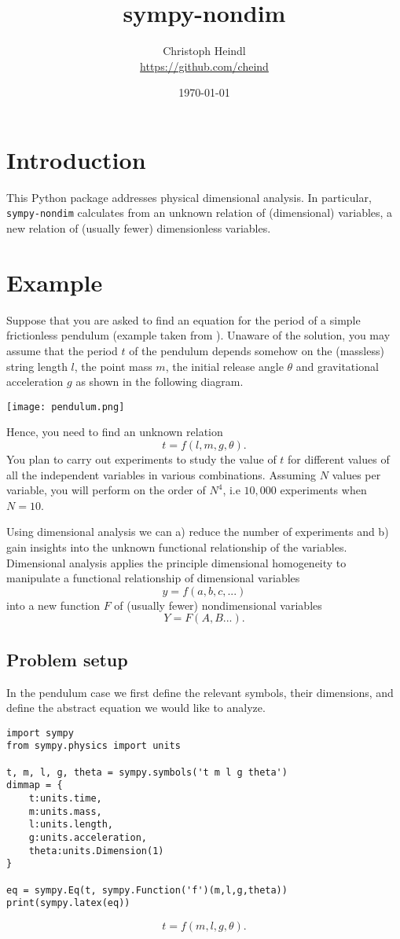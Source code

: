 \documentclass[11pt]{article}
\title{sympy-nondim}
\author{Christoph Heindl \\ \url{https://github.com/cheind} }
\date{\today}
\begin{document}
\maketitle

\section{Introduction}
This Python package addresses physical dimensional analysis. In particular, \texttt{sympy-nondim} calculates from an unknown relation of (dimensional) variables, a new relation of (usually fewer) dimensionless variables.

\section{Example}
Suppose that you are asked to find an equation for the period of a simple frictionless pendulum (example taken from \cite{lemons2017student}). Unaware of the solution, you may assume that the period $t$ of the pendulum depends somehow on the (massless) string length $l$, the point mass $m$, the initial release angle $\theta$ and gravitational acceleration $g$ as shown in the following diagram.
\begin{center}
\texttt{[image: pendulum.png]}
\end{center}
Hence, you need to find an unknown relation $$t = f(l,m,g,\theta).$$ You plan to carry out experiments to study the value of $t$ for different values of all the independent variables in various combinations. Assuming $N$ values per variable, you will perform on the order of $N^4$, i.e $10,000$ experiments when $N=10$. 

Using dimensional analysis we can a) reduce the number of experiments and b) gain insights into the unknown functional relationship of the variables. Dimensional analysis applies the principle dimensional homogeneity to manipulate a functional relationship of dimensional variables $$y = f(a,b,c,...)$$ into a new function $F$ of (usually fewer) nondimensional variables $$Y = F(A,B...).$$

\subsection{Problem setup}
In the pendulum case we first define the relevant symbols, their dimensions, and define the abstract equation we would like to analyze.
\begin{verbatim}
import sympy
from sympy.physics import units

t, m, l, g, theta = sympy.symbols('t m l g theta')
dimmap = {
    t:units.time, 
    m:units.mass, 
    l:units.length, 
    g:units.acceleration, 
    theta:units.Dimension(1)
}

eq = sympy.Eq(t, sympy.Function('f')(m,l,g,theta))
print(sympy.latex(eq))
\end{verbatim}
$$t = f{\left(m,l,g,\theta \right)}.$$
\end{document}
